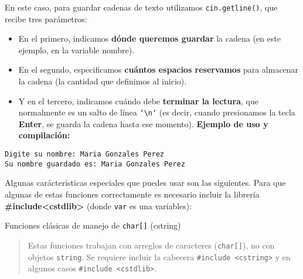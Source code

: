 \documentclass[
  11pt,
  a4paper,
  DIV=11,
  numbers=noendperiod]{scrreprt}
\providecommand{\tightlist}{%
  \setlength{\itemsep}{0pt}\setlength{\parskip}{0pt}}
\begin{document}
En este caso, para guardar cadenas de texto utilizamos
\texttt{cin.getline()}, que recibe tres parámetros:

\begin{itemize}
\tightlist
\item
  En el primero, indicamos \textbf{dónde queremos guardar} la cadena (en
  este ejemplo, en la variable nombre).
\item
  En el segundo, especificamos \textbf{cuántos espacios reservamos} para
  almacenar la cadena (la cantidad que definimos al inicio).\\
\item
  Y en el tercero, indicamos cuándo debe \textbf{terminar la lectura},
  que normalmente es un salto de línea \texttt{`\textbackslash n`} (es
  decir, cuando presionamos la tecla \textbf{Enter}, se guarda la cadena
  hasta ese momento). \textbf{Ejemplo de uso y compilación:}
\end{itemize}

\begin{tcolorbox}[custombox]
\begin{verbatim}
Digite su nombre: Maria Gonzales Perez
Su nombre guardado es: Maria Gonzales Perez
\end{verbatim}
\end{tcolorbox}

Algunas carácteristicas especiales que puedes usar son las siguientes.
Para que algunas de estas funciones correctamente es necesario incluir
la librería \textbf{\#include\textless cstdlib\textgreater{}} (donde
\texttt{var} es una variables):

Funciones clásicas de manejo de \texttt{char{[}{]}} (cstring)

\begin{quote}
Estas funciones trabajan con arreglos de caracteres
(\texttt{char{[}{]}}), no con objetos \texttt{string}. Se requiere
incluir la cabecera \texttt{\#include\ \textless{}cstring\textgreater{}}
y en algunos casos \texttt{\#include\ \textless{}cstdlib\textgreater{}}.
\end{quote}
\end{document}
